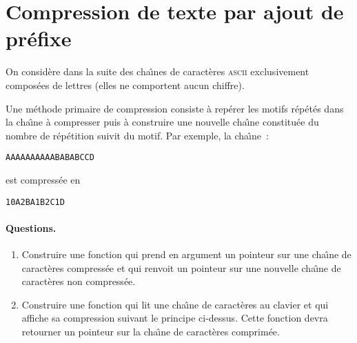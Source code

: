 \section{Compression de texte par ajout de pr\'efixe}
On consid\`ere dans la suite des cha\^\i{}nes de caract\`eres
\textsc{ascii} exclusivement compos\'ees de lettres (elles ne
comportent aucun chiffre).
\par
Une m\'ethode  primaire  de  compression  consiste \`a  rep\'erer  les
motifs   r\'ep\'et\'es dans  la cha\^\i{}ne   \`a  compresser puis \`a
construire  une   nouvelle  cha\^\i{}ne  constitu\'ee  du    nombre de
r\'ep\'etition suivit du motif. Par exemple, la cha\^\i{}ne~:
\begin{verbatim}
AAAAAAAAAABABABCCD
\end{verbatim}
est compress\'ee en
\begin{verbatim}
10A2BA1B2C1D
\end{verbatim}
\paragraph{Questions.}
\begin{enumerate}
\item  Construire une fonction qui  prend  en argument un pointeur sur
  une  cha\^\i{}ne de caract\`eres    compress\'ee et qui   renvoit un
  pointeur  sur   une  nouvelle    cha\^\i{}ne  de caract\`eres    non
  compress\'ee.
\item Construire une fonction qui lit  une cha\^\i{}ne de caract\`eres
  au  clavier et  qui  affiche sa    compression  suivant le  principe
  ci-dessus. Cette fonction   devra  retourner  un pointeur   sur   la
  cha\^\i{}ne de caract\`eres comprim\'ee.
\end{enumerate}
